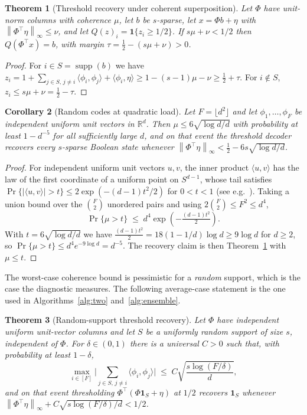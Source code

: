 \documentclass[preprint,12pt]{elsarticle}
\newtheorem{theorem}{Theorem}[section]
\newtheorem{corollary}[theorem]{Corollary}
\theoremstyle{definition}
\newcommand{\R}{\mathbb{R}}
\newcommand{\norm}[1]{\left\lVert #1 \right\rVert}
\begin{document}
\begin{theorem}[Threshold recovery under coherent superposition]
\label{thm:coherence}
Let $\Phi$ have unit-norm columns with coherence $\mu$, let $b$ be $s$-sparse, let
$x=\Phi b+\eta$ with $\norm{\Phi^{\top}\eta}_\infty\le\nu$, and let $Q(z)_i=\mathbf
1\{z_i\ge1/2\}$. If $s\mu+\nu<1/2$ then $Q(\Phi^{\top}x)=b$, with margin
$\tau=\tfrac12-(s\mu+\nu)>0$.
\end{theorem}

\begin{proof}
For $i\in S=\operatorname{supp}(b)$ we have
$z_i=1+\sum_{j\in S,\,j\neq i}\langle\phi_i,\phi_j\rangle+\langle\phi_i,\eta\rangle
\ge1-(s-1)\mu-\nu\ge\tfrac12+\tau$. For $i\notin S$,
$z_i\le s\mu+\nu=\tfrac12-\tau$.
\end{proof}

\begin{corollary}[Random codes at quadratic load]
\label{cor:randomcode}
Let $F=\lfloor d^2\rfloor$ and let $\phi_1,\dots,\phi_F$ be independent uniform unit vectors in
$\R^d$. Then $\mu\le6\sqrt{\log d/d}$ with probability at least $1-d^{-5}$ for all
sufficiently large $d$, and on that event the threshold decoder recovers every $s$-sparse
Boolean state whenever $\norm{\Phi^{\top}\eta}_\infty<\tfrac12-6s\sqrt{\log d/d}$.
\end{corollary}

\begin{proof}
For independent uniform unit vectors $u,v$, the inner product $\langle u,v\rangle$ has the law
of the first coordinate of a uniform point on $S^{d-1}$, whose tail satisfies
$\Pr\{|\langle u,v\rangle|>t\}\le2\exp(-(d-1)t^2/2)$ for $0<t<1$
(see e.g.~\cite[Thm.~3.4.6]{vershynin2018hdp}). Taking a union bound over the
$\binom{F}{2}$ unordered pairs and using $2\binom F2\le F^2\le d^4$,
\[
  \Pr\{\mu>t\}\;\le\;d^4\exp\!\left(-\tfrac{(d-1)t^2}{2}\right).
\]
With $t=6\sqrt{\log d/d}$ we have $\tfrac{(d-1)t^2}{2}=18(1-1/d)\log d\ge9\log d$ for $d\ge2$,
so $\Pr\{\mu>t\}\le d^4 e^{-9\log d}=d^{-5}$. The recovery claim is then
Theorem~\ref{thm:coherence} with $\mu\le t$.
\end{proof}

The worst-case coherence bound is pessimistic for a \emph{random} support, which is the case
the diagnostic measures. The following average-case statement is the one used in
Algorithms~\ref{alg:two} and~\ref{alg:ensemble}.

\begin{theorem}[Random-support threshold recovery]
\label{thm:randomsupport}
Let $\Phi$ have independent uniform unit-vector columns and let $S$ be a uniformly random
support of size $s$, independent of $\Phi$. For $\delta\in(0,1)$ there is a universal $C>0$
such that, with probability at least $1-\delta$,
\[
  \max_{i\in[F]}\Big|\sum_{j\in S,\,j\neq i}\langle\phi_i,\phi_j\rangle\Big|
  \;\le\;C\sqrt{\frac{s\log(F/\delta)}{d}},
\]
and on that event thresholding $\Phi^{\top}(\Phi\mathbf 1_S+\eta)$ at $1/2$ recovers
$\mathbf 1_S$ whenever $\norm{\Phi^{\top}\eta}_\infty+C\sqrt{s\log(F/\delta)/d}<1/2$.
\end{theorem}
\end{document}
